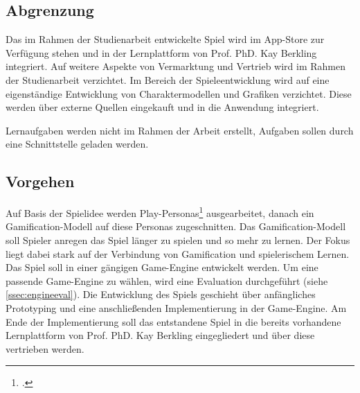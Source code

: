 \subsection{Abgrenzung}
	Das im Rahmen der Studienarbeit entwickelte Spiel wird im App-Store zur Verfügung stehen und in der Lernplattform von Prof. PhD. Kay Berkling integriert. Auf weitere Aspekte von Vermarktung und Vertrieb wird im Rahmen der Studienarbeit verzichtet.
	Im Bereich der Spieleentwicklung wird auf eine eigenständige Entwicklung von Charaktermodellen und Grafiken verzichtet. Diese werden über externe Quellen eingekauft und in die Anwendung integriert.

	Lernaufgaben werden nicht im Rahmen der Arbeit erstellt, Aufgaben sollen durch eine Schnittstelle geladen werden.

\subsection{Vorgehen}
	Auf Basis der Spielidee werden Play-Personas\footcite{persona} ausgearbeitet, danach ein Gamification-Modell auf diese Personas zugeschnitten. Das Gamification-Modell soll Spieler anregen das Spiel länger zu spielen und so mehr zu lernen. Der Fokus liegt dabei stark auf der Verbindung von Gamification und spielerischem Lernen.
	Das Spiel soll in einer gängigen Game-Engine entwickelt werden. Um eine passende Game-Engine zu wählen, wird eine Evaluation durchgeführt (siehe \ref{ssec:engineeval}).
	Die Entwicklung des Spiels geschieht über anfängliches Prototyping und eine anschließenden Implementierung in der Game-Engine. Am Ende der Implementierung soll das entstandene Spiel in die bereits vorhandene Lernplattform von Prof. PhD. Kay Berkling eingegliedert und über diese vertrieben werden.
